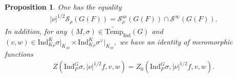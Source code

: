 \documentclass[10pt]{amsart}
\newtheorem{proposition}[theorem]{Proposition}
\theoremstyle{definition}
\numberwithin{equation}{section}
\numberwithin{equation}{subsection}
\newcommand{\Ind}{\mathrm{Ind}}
\newcommand{\Temp}{\mathrm{Temp}}
\begin{document}
 

\begin{proposition} \label{Snur:HCSchwartz}
One has the equality
\begin{align*}
    |\nu|^{1/2}\mathcal{S}_\rho(G(F)) = \mathcal{S}_\rho^{\mathrm{as}}(G(F))\cap \mathcal{S}^\infty(G(F)).
\end{align*}
In addition, for any $(M,\sigma)\in \widetilde{\Temp}_{\Ind}(G)$ and $(v,w)\in  \Ind_{K_P}^K\sigma\vert_{K_M}\times \Ind_{K_P}^K\sigma^\vee\vert_{K_M},$ we have an identity of meromorphic functions 
     \begin{align}\label{eq:Z=Z0}
         Z(\mathrm{Ind}_P^G\sigma,|\nu|^{1/2}f,v,w)=Z_0(\mathrm{Ind}_P^G\sigma, |\nu|^{1/2}f,v,w).
     \end{align}
\end{proposition}
\end{document}
